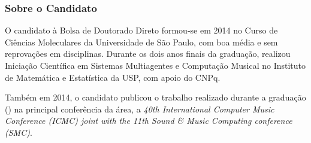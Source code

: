\documentclass[a4paper, 12pt]{article}
\begin{document}
\subsubsection{Sobre o Candidato}

O candidato à Bolsa de Doutorado Direto formou-se em 2014 no Curso de Ciências
Moleculares da Universidade de São Paulo, com boa média e sem reprovações em
disciplinas. Durante os dois anos finais da graduação, realizou Iniciação
Científica em Sistemas Multiagentes e Computação Musical no Instituto de
Matemática e Estatística da USP, com apoio do CNPq.

Também em 2014, o candidato publicou o trabalho realizado durante a graduação
(\citet{bruel2014protocol}) na principal conferência da área, a
\emph{40th International Computer Music Conference (ICMC) joint with the
11th Sound \& Music Computing conference (SMC)}.
\end{document}
